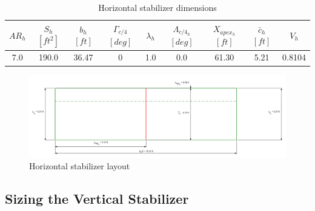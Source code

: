 \documentclass[conf]{new-aiaa}
\begin{document}
\begin{table}[H]
\centering
\caption{Horizontal stabilizer dimensions}
\begin{tabular}{|c|c|c|c|c|c|c|c|c|}\hline
    $AR_h$ & $S_h$ $[ft^2]$ & $b_h$ $[ft]$ & $\Gamma_{c/4}$ $[deg]$ & $\lambda_h$ & $\Lambda_{c/4_h}$ $[deg]$ & $X_{apex_h}$ $[ft]$ & $\bar{c}_h$ $[ft]$ & $V_h$  \\ \hline
    7.0 & 190.0 & 36.47 & 0 & 1.0 & 0.0 & 61.30 & 5.21 & 0.8104 \\ \hline
\end{tabular}
\label{tab:horizontal_stabilizer_size}
\end{table}

\begin{figure}[H]
    \includegraphics[width=\textwidth]{Report3Printouts/Empannage/Horizontal_geometry_plot.png}
    \caption{Horizontal stabilizer layout}
    \label{fig:horizontal_geometry_plot}
\end{figure}


\subsection{Sizing the Vertical Stabilizer}
\end{document}
